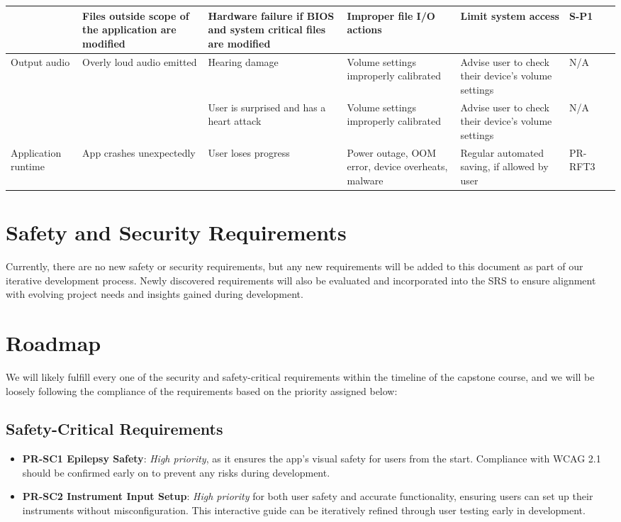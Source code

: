 \documentclass{article}
\begin{document}
\begin{longtable}{|>{\raggedright}p{2cm}|>{\raggedright}p{2.5cm}|>{\raggedright}p{2.5cm}|>{\raggedright}p{2.5cm}|>{\raggedright}p{2.5cm}|p{1.5cm}|p{1.5cm}|}
  \cline{2-7}
    & Files outside scope of the application are modified & Hardware failure if BIOS and system critical files are modified & Improper file I/O actions & Limit system access & S-P1 & \\
  \hline
    Output \newline audio & Overly loud audio emitted & Hearing damage & Volume settings improperly calibrated & Advise user to check their device's volume settings & N/A & \\
  \cline{3-7}
    & & User is surprised and has a heart attack & Volume settings improperly calibrated & Advise user to check their device's volume settings & N/A & \\ 
  \hline
    Application runtime & App crashes unexpectedly & User loses progress & Power outage, OOM error, device overheats, malware & Regular automated saving, if allowed by user & PR-RFT3 & \\
  \hline
\end{longtable}

\section{Safety and Security Requirements}

Currently, there are no new safety or security requirements, but any new requirements will be added to this document as part of our iterative development process. Newly discovered requirements will also be evaluated and incorporated into the SRS to ensure alignment with evolving project needs and insights gained during development.


\section{Roadmap}

We will likely fulfill every one of the security and safety-critical requirements within the timeline of the capstone course, and we will be loosely following the compliance of the requirements based on the priority assigned below:

\subsection{Safety-Critical Requirements}
\begin{itemize}
    \item \textbf{PR-SC1 Epilepsy Safety}: \textit{High priority}, as it ensures the app’s visual safety for users from the start. Compliance with WCAG 2.1 should be confirmed early on to prevent any risks during development.
    \item \textbf{PR-SC2 Instrument Input Setup}: \textit{High priority} for both user safety and accurate functionality, ensuring users can set up their instruments without misconfiguration. This interactive guide can be iteratively refined through user testing early in development.
\end{itemize}
\end{document}
